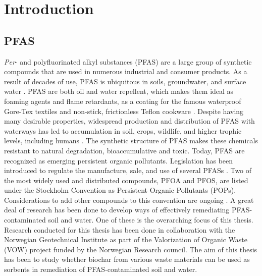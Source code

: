 \chapter{Introduction}\label{chap:intro}

\section{PFAS}
\textit{Per}- and polyfluorinated alkyl substances (PFAS) are a large group of synthetic compounds that are used in numerous industrial and consumer products. As a result of decades of use, PFAS is ubiquitous in soils, groundwater, and surface water \citep{rankin2016north}. PFAS are both oil and water repellent, which makes them ideal as foaming agents and flame retardants, as a coating for the famous waterproof Gore-Tex\textsuperscript{\textregistered} textiles and non-stick, frictionless Teflon\textsuperscript{\texttrademark} cookware \citep{du2014adsorption}. Despite having many desirable properties, widespread production and distribution of PFAS with waterways has led to accumulation in soil, crops, wildlife, and higher trophic levels, including humans \citep{bhhatarai2011,Lau2007}. The synthetic structure of PFAS makes these chemicals resistant to natural degradation, bioaccumulative and toxic. Today, PFAS are recognized as emerging persistent organic pollutants. Legislation has been introduced to regulate the manufacture, sale, and use of several PFASs \citep{EPA2014,ECHA2020,EC2020PFAS,MD2016workshop}. Two of the most widely used and distributed compounds, PFOA and PFOS, are listed under the Stockholm Convention as Persistent Organic Pollutants (POPs). Considerations to add other compounds to this convention are ongoing \citep{EC2020PFAS}. A great deal of research has been done to develop ways of effectively remediating PFAS-contaminated soil and water. One of these is the overarching focus of this thesis. Research conducted for this thesis has been done in collaboration with the Norwegian Geotechnical Institute as part of the Valorization of Organic Waste (VOW) project funded by the Norwegian Research council. The aim of this thesis has been to study whether biochar from various waste materials can be used as sorbents in remediation of PFAS-contaminated soil and water.

